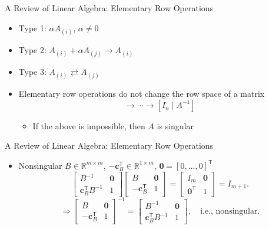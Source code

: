\documentclass[aspectratio=169,hyperref,UTF8,CJK]{beamer}
\newcommand{\R}{\mathbb{R}}
\newcommand{\trans}{\mathsf{T}}
\newcommand{\vect}[1]{\boldsymbol{#1}}
\begin{document}
\begin{frame}{A Review of Linear Algebra: Elementary Row Operations}
  \begin{itemize}
    \item Type 1: $\alpha A_{(i)}$, $\alpha\ne0$
    \item Type 2: $A_{(i)}+\alpha A_{(j)}\rightarrow A_{(i)}$
    \item Type 3: $A_{(i)}\rightleftarrows A_{(j)}$
    \item Elementary row operations do not change the row space of a matrix
      \begin{equation*}
        [A\mid I_n]\longrightarrow\cdots\longrightarrow[I_n\mid A^{-1}]
      \end{equation*}
      \begin{itemize}
        \item If the above is impossible, then $A$ is singular
      \end{itemize}
  \end{itemize}
\end{frame}

\begin{frame}{A Review of Linear Algebra: Elementary Row Operations}
  \small
  \begin{itemize}
    \item Nonsingular $B\in\R^{m\times m}$, $-\vect{c}_B^{\trans}\in\R^{1\times m}$, $\vect{0}=[0,\ldots,0]^{\trans}$
      \begin{equation*}
        \begin{bmatrix}B^{-1}&\vect{0}\\\vect{c}_B^{\trans}B^{-1}&1\end{bmatrix}
        \begin{bmatrix}B&\vect{0}\\-\vect{c}_B^{\trans}&1\end{bmatrix}
        =\begin{bmatrix}I_m&\vect{0}\\\vect{0}^{\trans}&1\end{bmatrix}=I_{m+1}.
      \end{equation*}
      \begin{equation*}
        \Rightarrow
        \begin{bmatrix}B&\vect{0}\\-\vect{c}_B^{\trans}&1\end{bmatrix}^{-1}
        =\begin{bmatrix}B^{-1}&\vect{0}\\\vect{c}_B^{\trans}B^{-1}&1\end{bmatrix},
        \quad\text{i.e., nonsingular.}
      \end{equation*}
  \end{itemize}
\end{frame}
\end{document}

